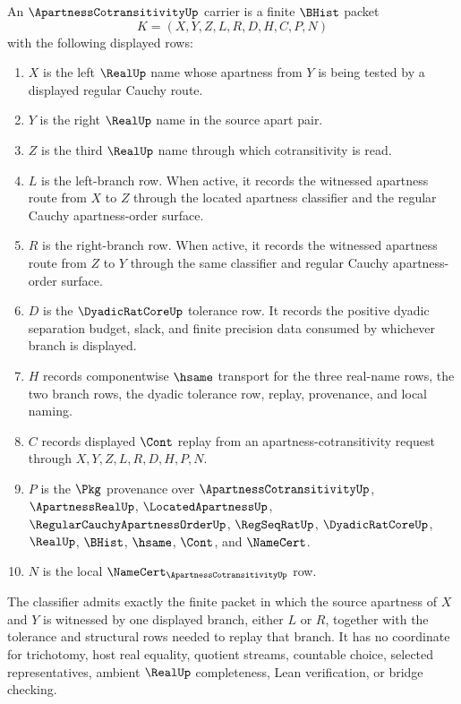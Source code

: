 \begin{definition}
\label{def:apartness-cotransitivity-carrier}
An $\ApartnessCotransitivityUp$ carrier is a finite $\BHist$ packet
$$
K=(X,Y,Z,L,R,D,H,C,P,N)
$$
with the following displayed rows:
\begin{enumerate}
\item $X$ is the left $\RealUp$ name whose apartness from $Y$ is being tested by a displayed regular Cauchy route.
\item $Y$ is the right $\RealUp$ name in the source apart pair.
\item $Z$ is the third $\RealUp$ name through which cotransitivity is read.
\item $L$ is the left-branch row. When active, it records the witnessed apartness route from $X$ to $Z$ through the located apartness classifier and the regular Cauchy apartness-order surface.
\item $R$ is the right-branch row. When active, it records the witnessed apartness route from $Z$ to $Y$ through the same classifier and regular Cauchy apartness-order surface.
\item $D$ is the $\DyadicRatCoreUp$ tolerance row. It records the positive dyadic separation budget, slack, and finite precision data consumed by whichever branch is displayed.
\item $H$ records componentwise $\hsame$ transport for the three real-name rows, the two branch rows, the dyadic tolerance row, replay, provenance, and local naming.
\item $C$ records displayed $\Cont$ replay from an apartness-cotransitivity request through $X,Y,Z,L,R,D,H,P,N$.
\item $P$ is the $\Pkg$ provenance over $\ApartnessCotransitivityUp$, $\ApartnessRealUp$, $\LocatedApartnessUp$, $\RegularCauchyApartnessOrderUp$, $\RegSeqRatUp$, $\DyadicRatCoreUp$, $\RealUp$, $\BHist$, $\hsame$, $\Cont$, and $\NameCert$.
\item $N$ is the local $\NameCert_{\ApartnessCotransitivityUp}$ row.
\end{enumerate}
The classifier admits exactly the finite packet in which the source apartness of $X$ and $Y$ is witnessed by one displayed branch, either $L$ or $R$, together with the tolerance and structural rows needed to replay that branch. It has no coordinate for trichotomy, host real equality, quotient streams, countable choice, selected representatives, ambient $\RealUp$ completeness, Lean verification, or bridge checking.
\end{definition}

